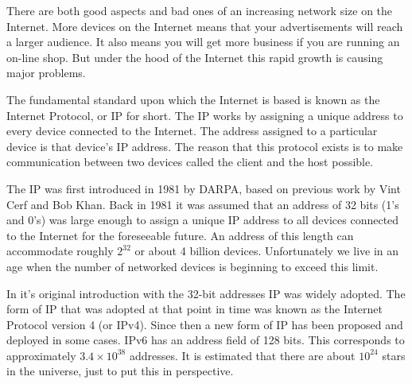 %

There are both good aspects and bad ones of an increasing network size on the Internet. More devices on the Internet
means that your advertisements will reach a larger audience. It also means you will get more business if 
you are running an on-line shop. But under the hood of the Internet this rapid growth is causing major problems. 


The fundamental standard upon which the Internet is based is known as the Internet Protocol, or IP for short. The IP works by assigning a unique address to every device connected to the Internet. The address assigned to a particular device is that device's IP address. The reason that this protocol exists is to make communication between two devices called the client and the host possible. 


The IP was first introduced in 1981 by DARPA\cite{rfc0791}, based on previous work by Vint Cerf and Bob Khan\cite{1092259}. Back in 1981 it was assumed that an address of 32 bits (1's and 0's) was large enough to assign a unique IP address to all devices connected to the Internet for the foreseeable future. An address of this length can accommodate roughly $2^{32}$ or about 4 billion devices. Unfortunately we live in an age when the number of networked devices is beginning to exceed this limit.


In it's original introduction with the 32-bit addresses IP was widely adopted. The form of IP that was adopted at that point in time was known as the Internet Protocol version 4 (or IPv4). Since then a new form of IP has been proposed\cite{rfc1883}\cite{rfc2460} and deployed in some cases. IPv6 has an address field of 128 bits. This corresponds to approximately $3.4 \times 10^{38}$ addresses. It is estimated that there are about $10^{24}$ stars in the universe, just to put this in perspective.

